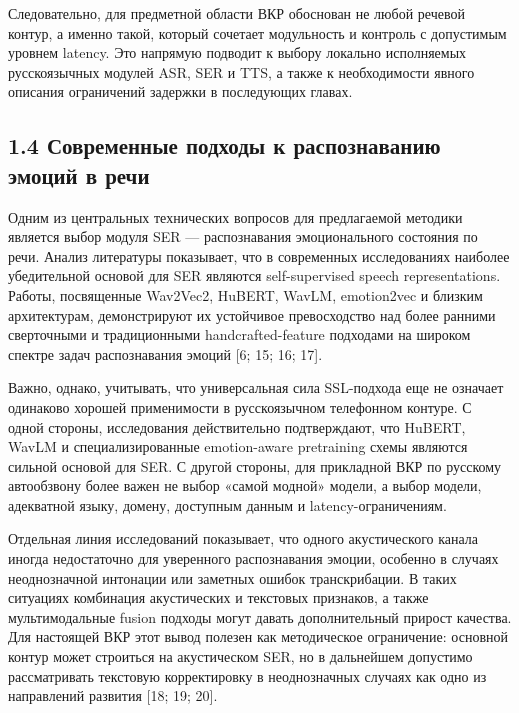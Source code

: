 \documentclass[a4paper,14pt]{extarticle}
\renewcommand{\texttt}[1]{\textnormal{#1}}
\begin{document}
Следовательно, для предметной области ВКР обоснован не любой речевой
контур, а именно такой, который сочетает модульность и контроль с
допустимым уровнем latency. Это напрямую подводит к выбору локально
исполняемых русскоязычных модулей \texttt{ASR}, \texttt{SER} и
\texttt{TTS}, а также к необходимости явного описания ограничений
задержки в последующих главах.

\subsection{1.4 Современные подходы к распознаванию эмоций в
речи}\label{ux441ux43eux432ux440ux435ux43cux435ux43dux43dux44bux435-ux43fux43eux434ux445ux43eux434ux44b-ux43a-ux440ux430ux441ux43fux43eux437ux43dux430ux432ux430ux43dux438ux44e-ux44dux43cux43eux446ux438ux439-ux432-ux440ux435ux447ux438}

Одним из центральных технических вопросов для предлагаемой методики
является выбор модуля \texttt{SER} --- распознавания эмоционального
состояния по речи. Анализ литературы показывает, что в современных
исследованиях наиболее убедительной основой для SER являются
self-supervised speech representations. Работы, посвященные
\texttt{Wav2Vec2}, \texttt{HuBERT}, \texttt{WavLM}, \texttt{emotion2vec}
и близким архитектурам, демонстрируют их устойчивое превосходство над
более ранними сверточными и традиционными handcrafted-feature подходами
на широком спектре задач распознавания эмоций {[}6; 15; 16; 17{]}.

Важно, однако, учитывать, что универсальная сила SSL-подхода еще не
означает одинаково хорошей применимости в русскоязычном телефонном
контуре. С одной стороны, исследования действительно подтверждают, что
\texttt{HuBERT}, \texttt{WavLM} и специализированные emotion-aware
pretraining схемы являются сильной основой для SER. С другой стороны,
для прикладной ВКР по русскому автообзвону более важен не выбор «самой
модной» модели, а выбор модели, адекватной языку, домену, доступным
данным и latency-ограничениям.

Отдельная линия исследований показывает, что одного акустического канала
иногда недостаточно для уверенного распознавания эмоции, особенно в
случаях неоднозначной интонации или заметных ошибок транскрибации. В
таких ситуациях комбинация акустических и текстовых признаков, а также
мультимодальные fusion подходы могут давать дополнительный прирост
качества. Для настоящей ВКР этот вывод полезен как методическое
ограничение: основной контур может строиться на акустическом
\texttt{SER}, но в дальнейшем допустимо рассматривать текстовую
корректировку в неоднозначных случаях как одно из направлений развития
{[}18; 19; 20{]}.
\end{document}
